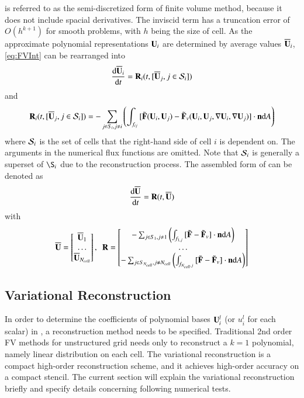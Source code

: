 \documentclass[preprint,12pt]{elsarticle}
\begin{document}
is referred to as the semi-discretized form of finite volume method,
because it does not include spacial derivatives.
The inviscid term has a truncation error of $O(h^{k+1})$ for smooth problems,
with $h$ being the size of cell.
As the approximate polynomial representations $\mathbf{U}_i$ are determined
by average values $\overline{\mathbf{U}}_i$, \eqref{eq:FVInt} can be rearranged into
\begin{equation}
    \label{eq:FVODECell}
    \derivative{\uu_i}{t} = \R_i(t, [\uu_j, j\in\SAll_i])
\end{equation}
and
\begin{equation}
    \mathbf{R}_i(t, [\overline{\mathbf{U}}_j, j\in\mathcal{S}_i]) = -\sum_{j\in S_i, j\neq i}{\left(
        \int_{f_{ij}}{
            [\tilde{\mathbf{F}}(\mathbf{U}_i,\mathbf{U}_j) - \tilde{\mathbf{F}}_v(\mathbf{U}_i,\mathbf{U}_j, \nabla \mathbf{U}_i, \nabla \mathbf{U}_j)] \cdot \mathbf{n}  \dd A
        }\right)
    }
\end{equation}
where
$\mathcal{S}_i$ is the set of cells that the right-hand side of cell $i$ is
dependent on. The arguments in the numerical flux functions are omitted.
Note that $\mathcal{S}_i$ is generally a superset of $\S_i$ due to
the reconstruction process.
The
assembled form of  can be denoted as
\begin{equation}
    \label{eq:FVODE}
    \derivative{\uu}{t} = \R(t, \uu)
\end{equation}
with
\begin{equation}
    \overline{\mathbf{U}} = \begin{bmatrix}
        \overline{\mathbf{U}}_1 \\
        \dots \\
        \overline{\mathbf{U}}_{N_{cell}}
    \end{bmatrix},\ \
    \mathbf{R} = \begin{bmatrix}
        -\sum_{j\in S_1, j\neq 1}{\left(
            \int_{f_{1,j}}{
                [\tilde{\mathbf{F}} - \tilde{\mathbf{F}}_v] \cdot \mathbf{n}  \dd A
            }\right)
        }     \\
        \dots \\
        -\sum_{j\in S_{N_{cell}}, j\neq N_{cell}}{\left(
            \int_{f_{N_{cell},j}}{
                [\tilde{\mathbf{F}} - \tilde{\mathbf{F}}_v] \cdot \mathbf{n}  \dd A
            }\right)
        }
    \end{bmatrix}
\end{equation}





\subsection{Variational Reconstruction}
\label{ssec:VR}
In order to determine the coefficients of polynomial bases $\mathbf{U}_i^l$ (or $u_i^l$ for each scalar) in
\eeqref{eq:FVRec}, a reconstruction method needs to be specified.
Traditional 2nd order FV methods for unstructured grid
needs only to reconstruct a $k=1$ polynomial, namely linear
distribution on each cell.
The variational reconstruction \cite{wang2017compact_VR}
is a compact high-order
reconstruction scheme, and it achieves high-order
accuracy on a compact stencil.
The current section will explain the variational reconstruction briefly
and specify details concerning following numerical tests.
\end{document}
